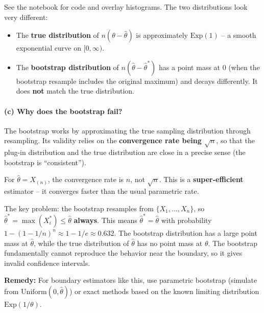 \documentclass[11pt]{article}
\begin{document}
See the notebook for code and overlay histograms. The two distributions look very different:
\begin{itemize}
  \item The \textbf{true distribution} of $n(\theta - \hat{\theta})$ is approximately $\text{Exp}(1)$ -- a smooth exponential curve on $[0, \infty)$.
  \item The \textbf{bootstrap distribution} of $n(\hat{\theta} - \hat{\theta}^*)$ has a point mass at 0 (when the bootstrap resample includes the original maximum) and decays differently. It does \textbf{not} match the true distribution.
\end{itemize}

\paragraph{(c) Why does the bootstrap fail?}

The bootstrap works by approximating the true sampling distribution through resampling. Its validity relies on the \textbf{convergence rate being $\sqrt{n}$}, so that the plug-in distribution and the true distribution are close in a precise sense (the bootstrap is ``consistent'').

For $\hat{\theta} = X_{(n)}$, the convergence rate is $n$, not $\sqrt{n}$. This is a \textbf{super-efficient} estimator -- it converges faster than the usual parametric rate.

The key problem: the bootstrap resamples from $\{X_1, \ldots, X_n\}$, so $\hat{\theta}^* = \max(X_i^*) \leq \hat{\theta}$ \textbf{always}. This means $\hat{\theta}^* = \hat{\theta}$ with probability $1 - (1-1/n)^n \approx 1 - 1/e \approx 0.632$. The bootstrap distribution has a large point mass at $\hat{\theta}$, while the true distribution of $\hat{\theta}$ has no point mass at $\theta$. The bootstrap fundamentally cannot reproduce the behavior near the boundary, so it gives invalid confidence intervals.

\textbf{Remedy:} For boundary estimators like this, use parametric bootstrap (simulate from $\text{Uniform}(0, \hat{\theta})$) or exact methods based on the known limiting distribution $\text{Exp}(1/\theta)$.
\end{document}
